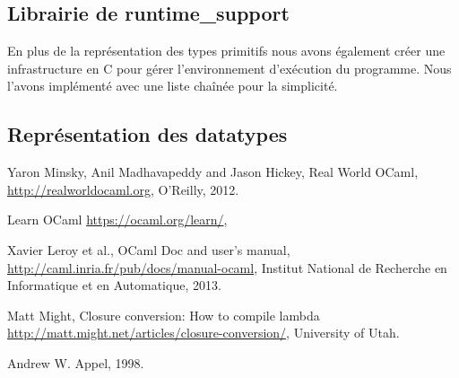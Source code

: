 \documentclass{article}
\begin{document}
\subsection{Librairie de runtime\_support}
En plus de la représentation des types primitifs nous avons également créer
une infrastructure en C pour gérer l'environnement d'exécution du programme.
Nous l'avons implémenté avec une liste chaînée pour la simplicité.

\subsection{Représentation des datatypes}

\begin{thebibliography}{9}

	Yaron Minsky, Anil Madhavapeddy and Jason Hickey,
	Real World OCaml,
	\url{http://realworldocaml.org},
	O'Reilly,
	2012.

	Learn OCaml
	\url{https://ocaml.org/learn/},

	Xavier Leroy et al.,
	OCaml Doc and user's manual,
	\url{http://caml.inria.fr/pub/docs/manual-ocaml},
	Institut National de Recherche en Informatique et en Automatique,
	2013.

	Matt Might,
  Closure conversion: How to compile lambda
	\url{http://matt.might.net/articles/closure-conversion/},
  University of Utah.
   
    Andrew W. Appel,
    1998.

\end{thebibliography}
\end{document}
